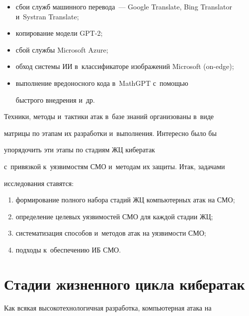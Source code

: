      \begin{itemize}

\item сбои служб машинного перевода~--- Google Translate, Bing Translator и~Systran Translate;

\item копирование модели GPT-2;

\item сбой службы Microsoft Azure;

\item обход системы ИИ в~классификаторе изображений Microsoft (on-edge);

\item выполнение вредоносного кода в~MathGPT с~помощью 

быстрого внедрения и~др.

\end{itemize}



     Техники, методы и~тактики атак в~базе знаний организованы в~виде 

матрицы по этапам их разработки и~выполнения. Интересно было бы 

упорядочить эти этапы по стадиям ЖЦ кибератак 

с~привязкой к~уязвимостям СМО и~методам их защиты. Итак, задачами 

исследования ставятся:

     \begin{enumerate}[(1)]

\item формирование полного набора стадий ЖЦ компьютерных атак на СМО;

\item определение целевых уязвимостей СМО для каждой стадии ЖЦ; 

\item систематизация способов и~методов атак на уязвимости СМО;

\item подходы к~обеспечению ИБ СМО.

\end{enumerate}



\section{Стадии жизненного цикла кибератак}



    Как всякая высокотехнологичная разработка, компьютерная атака на 

